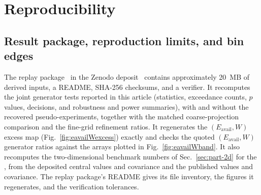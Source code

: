 \section{Reproducibility}
\label{app:reproducibility}

\subsection{Result package, reproduction limits, and bin edges}
\label{app:result-package}
\label{app:release}

The replay package~\cite{ReleaseCandidate2026} in the Zenodo deposit~\cite{ZenodoDeposit2026} contains approximately \SI{20}{MB} of derived inputs, a README, SHA-256 checksums, and a verifier. It recomputes the joint generator tests reported in this article (statistics, exceedance counts, $p$ values, decisions, and robustness and power summaries), with and without the recovered pseudo-experiments, together with the matched coarse-projection comparison and the fine-grid refinement ratios. It regenerates the $(E_{\mathrm{avail}},W)$ excess map (Fig.~\ref{fig:eavailWexcess}) exactly and checks the quoted $(E_{\mathrm{avail}},W)$ generator ratios against the arrays plotted in Fig.~\ref{fig:eavailWband}. It also recomputes the two-dimensional benchmark numbers of Sec.~\ref{sec:part-2d} for the \estTwoD{}, from the deposited central values and covariance and the published values and covariance. The replay package's README gives its file inventory, the figures it regenerates, and the verification tolerances.

